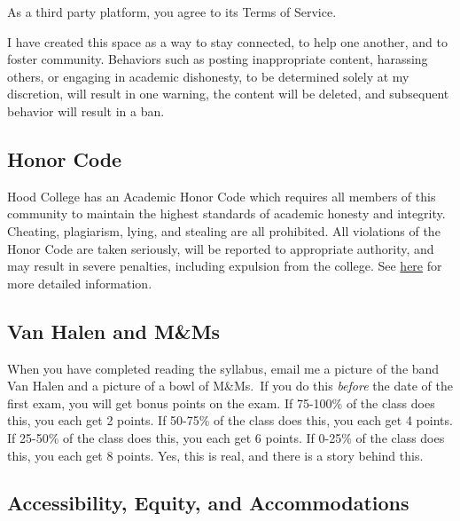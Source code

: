 \documentclass{article}
\begin{document}
As a third party platform, you agree to its Terms of Service.

I have created this space as a way to stay connected, to help one
another, and to foster community. Behaviors such as posting
inappropriate content, harassing others, or engaging in academic
dishonesty, to be determined solely at my discretion, will result in one
warning, the content will be deleted, and subsequent behavior will
result in a ban.

\hypertarget{honor-code}{%
\subsection*{Honor Code}\label{honor-code}}

Hood College has an Academic Honor Code which requires all members of
this community to maintain the highest standards of academic honesty and
integrity. Cheating, plagiarism, lying, and stealing are all prohibited.
All violations of the Honor Code are taken seriously, will be reported
to appropriate authority, and may result in severe penalties, including
expulsion from the college. See
\href{http://hood.smartcatalogiq.com/en/2016-2017/Catalog/The-Spirit-of-Hood/The-Academic-Honor-Code-and-Code-of-Conduct}{here}
for more detailed information.

\hypertarget{van-halen-and-mms}{%
\subsection*{Van Halen and M\&Ms}\label{van-halen-and-mms}}

When you have completed reading the syllabus, email me a picture of the
band Van Halen and a picture of a bowl of M\&Ms.~If you do this
\emph{before} the date of the first exam, you will get bonus points on
the exam. If 75-100\% of the class does this, you each get 2 points. If
50-75\% of the class does this, you each get 4 points. If 25-50\% of the
class does this, you each get 6 points. If 0-25\% of the class does
this, you each get 8 points. Yes, this is real, and there is a story
behind this.

\hypertarget{accessibility-equity-and-accommodations}{%
\subsection*{Accessibility, Equity, and
Accommodations}\label{accessibility-equity-and-accommodations}}
\end{document}
